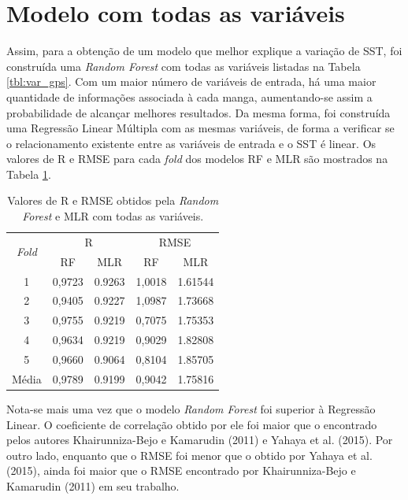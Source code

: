 \section{Modelo com todas as variáveis}

Assim, para a obtenção de um modelo que melhor explique a variação de SST, foi construída uma \textit{Random Forest} com todas as variáveis listadas na Tabela \ref{tbl:var_gps}. Com um maior número de variáveis de entrada, há uma maior quantidade de informações associada à cada manga, aumentando-se assim a probabilidade de alcançar melhores resultados. Da mesma forma, foi construída uma Regressão Linear Múltipla com as mesmas variáveis, de forma a verificar se o relacionamento existente entre as variáveis de entrada e o SST é linear. Os valores de R e RMSE para cada \textit{fold} dos modelos RF e MLR são mostrados na Tabela \ref{tbl:r_rmse_all}.

\begin{table}[H]
	\centering
	\caption{\label{tbl:r_rmse_all} Valores de R e RMSE obtidos pela \textit{Random Forest} e MLR com todas as variáveis.}
	\begin{tabular}{ccccc}
	\hline
	\multirow{2}{*}{\textit{Fold}} & \multicolumn{2}{c}{R} & \multicolumn{2}{c}{RMSE} \\ \cline{2-5}
	  	  & RF      & MLR    & RF 	  & MLR \\ \hline
	1     & 0,9723  & 0.9263 & 1,0018 & 1.61544 \\ \hline
	2     & 0,9405  & 0.9227 & 1,0987 & 1.73668 \\ \hline
	3     & 0,9755  & 0.9219 & 0,7075 & 1.75353 \\ \hline
	4     & 0,9634  & 0.9219 & 0,9029 & 1.82808 \\ \hline
	5     & 0,9660  & 0.9064 & 0,8104 & 1.85705 \\ \hline
	Média & 0,9789 	& 0.9199 & 0,9042 & 1.75816 \\ \hline
	\end{tabular}
\end{table}

Nota-se mais uma vez que o modelo \textit{Random Forest} foi superior à Regressão Linear. O coeficiente de correlação obtido por ele foi maior que o encontrado pelos autores Khairunniza-Bejo e Kamarudin (2011) e Yahaya et al. (2015). Por outro lado, enquanto que o RMSE foi menor que o obtido por Yahaya et al. (2015), ainda foi maior que o RMSE encontrado por Khairunniza-Bejo e Kamarudin (2011) em seu trabalho.

